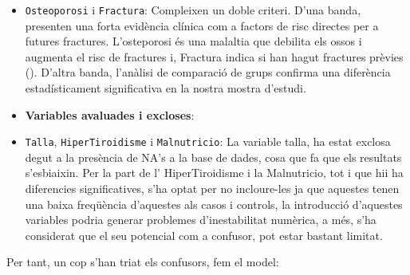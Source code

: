 \documentclass[
]{article}
\begin{document}
\begin{itemize}
\item
  \texttt{Osteoporosi} i \texttt{Fractura}: Compleixen un doble criteri.
  D'una banda, presenten una forta evidència clínica com a factors de
  risc directes per a futures fractures. L'osteporosi és una malaltia
  que debilita els ossos i augmenta el risc de fractures i, Fractura
  indica si han hagut fractures prèvies
  ().
  D'altra banda, l'anàlisi de comparació de grups confirma una
  diferència estadísticament significativa en la nostra mostra d'estudi.
\item
  \textbf{Variables avaluades i excloses}:
\item
  \texttt{Talla}, \texttt{HiperTiroidisme} i \texttt{Malnutricio}: La
  variable talla, ha estat exclosa degut a la presència de NA's a la
  base de dades, cosa que fa que els resultats s'esbiaixin. Per la part
  de l' HiperTiroidisme i la Malnutricio, tot i que hii ha diferencies
  significatives, s'ha optat per no incloure-les ja que aquestes tenen
  una baixa freqüència d'aquestes als casos i controls, la introducció
  d'aquestes variables podria generar problemes d'inestabilitat
  numèrica, a més, s'ha considerat que el seu potencial com a confusor,
  pot estar bastant limitat.
\end{itemize}

Per tant, un cop s'han triat els confusors, fem el model:
\end{document}
